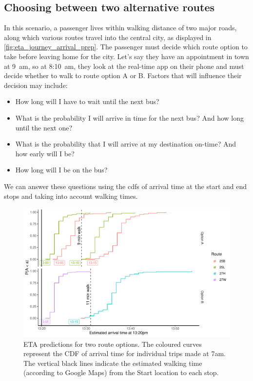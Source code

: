 \subsection{Choosing between two alternative routes}
\label{sec:journey_simple}



In this scenario, a passenger lives within walking distance of two major roads, along which various routes travel into the central city, as displayed in \cref{fig:eta_journey_arrival_prep}. The passenger must decide which route option to take before leaving home for the city. Let's say they have an appointment in town at 9~am, so at 8:10~am, they look at the real-time app on their phone and must decide whether to walk to route option A or B. Factors that will influence their decision may include:
\begin{itemize}
\item How long will I have to wait until the next bus?
\item What is the probability I will arrive in time for the next bus? And how long until the next one?
\item What is the probability that I will arrive at my destination on-time? And how early will I be?
\item How long will I be on the bus?
\end{itemize}
We can answer these questions using the \glspl{cdf} of arrival time at the start and end stops and taking into account walking times.


\begin{knitrout}
\color{fgcolor}\begin{figure}

{\centering \includegraphics[width=\textwidth]{figure/eta_journey_arrival-1} 

}

\caption[ETA predictions for two route options]{ETA predictions for two route options. The coloured curves represent the CDF of arrival time for individual trips made at 7am. The vertical black lines indicate the estimated walking time (according to Google Maps) from the Start location to each stop.}\label{fig:eta_journey_arrival}
\end{figure}


\end{knitrout}


